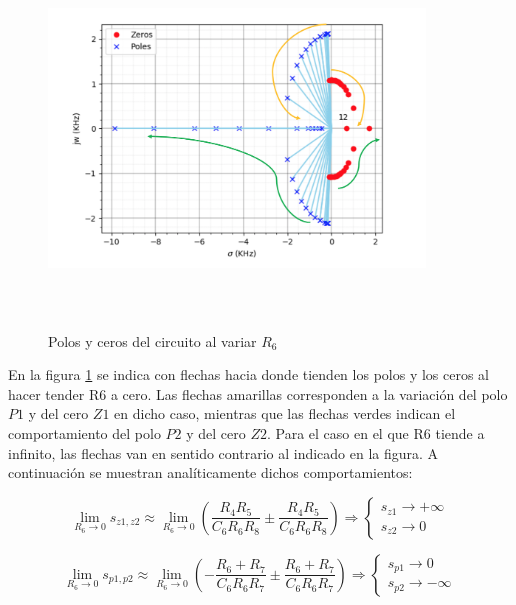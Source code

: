\begin{figure}[H] %
	\centering
	\includegraphics[width=10cm,height=10cm,keepaspectratio]{../EJ1/00GRAFICOS/r6.png}
	\caption{Polos y ceros del circuito al variar $R_6$}
	\label{r6}
\end{figure}

En la figura \ref{r6} se indica con flechas hacia donde tienden los polos y los ceros al hacer tender R6 a cero. Las flechas amarillas corresponden a la variaci\'on del polo $P1$ y del cero $Z1$ en dicho caso, mientras que las flechas verdes indican el comportamiento del polo $P2$ y del cero $Z2$. Para el caso en el que R6 tiende a infinito, las flechas van en sentido contrario al indicado en la figura. A continuaci\'on se muestran anal\'iticamente dichos comportamientos:

\begin{equation}
\lim_{R_6\to 0} s_{z1,z2} \approx \lim_{R_6\to 0}\left( \frac{R_4 R_5}{C_6 R_6 R_8} \pm \frac{R_4 R_5}{C_6 R_6 R_8}\right) \Rightarrow 
\begin{cases} 
s_{z1} \to +\infty\\
s_{z2} \to 0
\end{cases}
\end{equation}

\begin{equation}
\lim_{R_6\to 0} s_{p1,p2} \approx 	\lim_{R_6\to 0} \left( -\frac{R_6 + R_7}{C_6 R_6 R_7} \pm \frac{R_6 + R_7}{C_6 R_6 R_7} \right) \Rightarrow
\begin{cases} 
s_{p1} \to 0\\
s_{p2} \to -\infty
\end{cases}
\end{equation}

